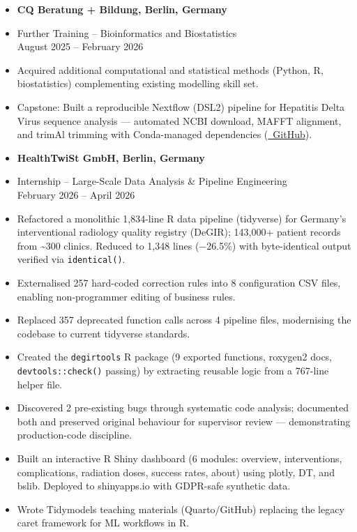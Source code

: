 \documentclass[margin,line,pifont,palatino,courier]{res}
\begin{document}
\begin{resume}
\begin{itemize}
\item {\bf CQ Beratung + Bildung, Berlin, Germany}\\
\vspace*{-.2in}
\item[] Further Training -- Bioinformatics and Biostatistics\\
August 2025 -- February 2026
\vspace*{.03in}
\item[-] Acquired additional computational and statistical methods (Python, R, biostatistics) complementing existing modelling skill set.
\item[-] Capstone: Built a reproducible Nextflow (DSL2) pipeline for Hepatitis Delta Virus sequence analysis --- automated NCBI download, MAFFT alignment, and trimAl trimming with Conda-managed dependencies (\href{https://github.com/thejusmahajan/hepatitis-delta-pipeline}{\faGithub\ GitHub}).
\end{itemize}
\vspace*{.03in}

\begin{itemize}
\item {\bf HealthTwiSt GmbH, Berlin, Germany}\\
\vspace*{-.2in}
\item[] Internship -- Large-Scale Data Analysis \& Pipeline Engineering\\
February 2026 -- April 2026
\vspace*{.1in}
\item[-] Refactored a monolithic 1,834-line R data pipeline (tidyverse) for Germany's interventional radiology quality registry (DeGIR); 143,000+ patient records from \textasciitilde300 clinics. Reduced to 1,348 lines ($-$26.5\%) with byte-identical output verified via \texttt{identical()}.
\item[-] Externalised 257 hard-coded correction rules into 8 configuration CSV files, enabling non-programmer editing of business rules.
\item[-] Replaced 357 deprecated function calls across 4 pipeline files, modernising the codebase to current tidyverse standards.
\item[-] Created the \texttt{degirtools} R package (9 exported functions, roxygen2 docs, \texttt{devtools::check()} passing) by extracting reusable logic from a 767-line helper file.
\item[-] Discovered 2 pre-existing bugs through systematic code analysis; documented both and preserved original behaviour for supervisor review --- demonstrating production-code discipline.
\item[-] Built an interactive R Shiny dashboard (6 modules: overview, interventions, complications, radiation doses, success rates, about) using plotly, DT, and bslib. Deployed to shinyapps.io with GDPR-safe synthetic data.
\item[-] Wrote Tidymodels teaching materials (Quarto/GitHub) replacing the legacy caret framework for ML workflows in R.
\end{itemize}
\vspace*{.03in}


\end{resume}
\end{document}
